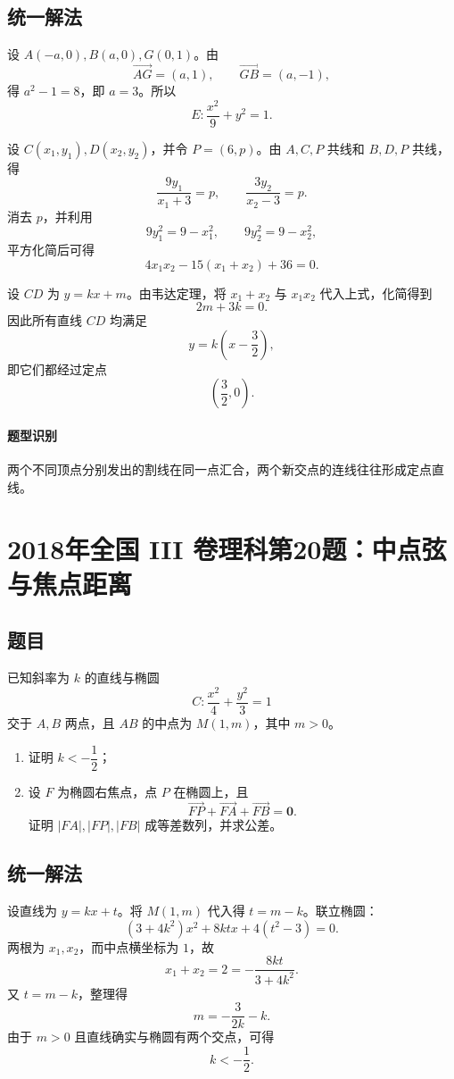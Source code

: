 \documentclass[11pt,a4paper]{ctexart}
\begin{document}
\subsection*{统一解法}
设 $A(-a,0),B(a,0),G(0,1)$。由
\[
\overrightarrow{AG}=(a,1),\qquad \overrightarrow{GB}=(a,-1),
\]
得 $a^2-1=8$，即 $a=3$。所以
\[
E:\frac{x^2}{9}+y^2=1.
\]

设 $C(x_1,y_1),D(x_2,y_2)$，并令 $P=(6,p)$。由 $A,C,P$ 共线和 $B,D,P$ 共线，得
\[
\frac{9y_1}{x_1+3}=p,\qquad
\frac{3y_2}{x_2-3}=p.
\]
消去 $p$，并利用
\[
9y_1^2=9-x_1^2,\qquad 9y_2^2=9-x_2^2,
\]
平方化简后可得
\[
4x_1x_2-15(x_1+x_2)+36=0.
\]

设 $CD$ 为 $y=kx+m$。由韦达定理，将 $x_1+x_2$ 与 $x_1x_2$ 代入上式，化简得到
\[
2m+3k=0.
\]
因此所有直线 $CD$ 均满足
\[
 y=k\left(x-\frac32\right),
\]
即它们都经过定点
\[
\boxed{\left(\frac32,0\right)}.
\]

\paragraph{题型识别} 两个不同顶点分别发出的割线在同一点汇合，两个新交点的连线往往形成定点直线。

\section{2018年全国 III 卷理科第20题：中点弦与焦点距离}

\subsection*{题目}
已知斜率为 $k$ 的直线与椭圆
\[
C:\frac{x^2}{4}+\frac{y^2}{3}=1
\]
交于 $A,B$ 两点，且 $AB$ 的中点为 $M(1,m)$，其中 $m>0$。

\begin{enumerate}
\item 证明 $k<-\dfrac12$；
\item 设 $F$ 为椭圆右焦点，点 $P$ 在椭圆上，且
\[
\overrightarrow{FP}+\overrightarrow{FA}+\overrightarrow{FB}=\mathbf0.
\]
证明 $|FA|,|FP|,|FB|$ 成等差数列，并求公差。
\end{enumerate}

\subsection*{统一解法}
设直线为 $y=kx+t$。将 $M(1,m)$ 代入得 $t=m-k$。联立椭圆：
\[
(3+4k^2)x^2+8ktx+4(t^2-3)=0.
\]
两根为 $x_1,x_2$，而中点横坐标为 $1$，故
\[
x_1+x_2=2=-\frac{8kt}{3+4k^2}.
\]
又 $t=m-k$，整理得
\[
m=-\frac{3}{2k}-k.
\]
由于 $m>0$ 且直线确实与椭圆有两个交点，可得
\[
\boxed{k<-\frac12}.
\]
\end{document}
